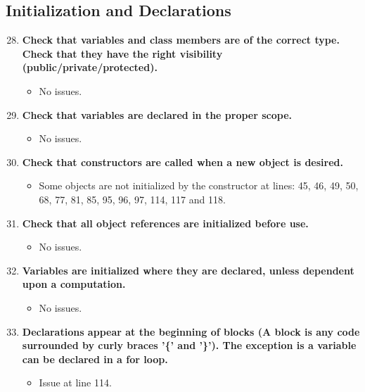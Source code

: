 \documentclass{article}
\begin{document}
		\subsection{Initialization and Declarations}
			\begin{enumerate}
				\setcounter{enumi}{27}
				\item \textbf{Check that variables and class members are of the correct type. Check	that they have the right visibility (public/private/protected).}
				\begin{itemize}
					\item No issues.
				\end{itemize}
				\item \textbf{Check that variables are declared in the proper scope.}
				\begin{itemize}
					\item No issues.
				\end{itemize}
				\item \textbf{Check that constructors are called when a new object is desired.}
				\begin{itemize}
					\item Some objects are not initialized by the constructor at lines: 45, 46, 49, 50, 68, 77, 81, 85, 95, 96, 97, 114, 117 and 118.
				\end{itemize}
				\item \textbf{Check that all object references are initialized before use.}
				\begin{itemize}
					\item No issues.
				\end{itemize}
				\item \textbf{Variables are initialized where they are declared, unless dependent upon a computation.}
				\begin{itemize}
					\item No issues.
				\end{itemize}
				\item \textbf{Declarations appear at the beginning of blocks (A block is any code surrounded by curly braces '\{' and '\}'). The exception is a variable can be declared in a for loop.}
				\begin{itemize}
					\item Issue at line 114.
				\end{itemize}
			\end{enumerate}
\end{document}
